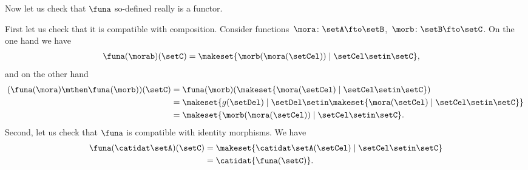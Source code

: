 \begin{example}
    Now let us check that $\funa$ so-defined really is a functor.

    First let us check that it is compatible with composition.
    Consider functions~$\mora\colon \setA\fto \setB$,~$\morb\colon \setB \fto \setC$.
    On the one hand we have
    \begin{equation}\label{eq:powerset-functor-example-3}
        \begin{aligned}
            \funa(\morab)(\setC) & =\makeset{ \morb(\mora(\setCel))\mid \setCel \setin \setC},
        \end{aligned}
    \end{equation}
    and on the other hand
    \begin{equation}\label{eq:powerset-functor-example-4}
        \begin{aligned}
            (\funa(\mora)\mthen \funa(\morb))(\setC)
             & =\funa(\morb) (\makeset{ \mora(\setCel) \mid \setCel \setin \setC}) \\
             & =\makeset{g(\setDel)\mid \setDel \setin \makeset{\mora(\setCel)\mid \setCel\setin \setC}} \\
             & =\makeset{ \morb(\mora(\setCel))\mid \setCel \setin \setC}.
        \end{aligned}
    \end{equation}
    Second, let us check that $\funa$ is compatible with identity morphisms.
    We have
    \begin{equation}\label{eq:powerset-functor-example-5}
        \begin{aligned}
            \funa(\catidat\setA)(\setC) & = \makeset{\catidat\setA(\setCel)\mid \setCel \setin \setC} \\
                                        & =\catidat{\funa(\setC)}.
        \end{aligned}
    \end{equation}
\end{example}

